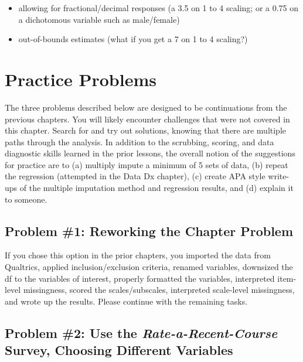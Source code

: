 \documentclass[
  11pt,
]{book}
\providecommand{\tightlist}{%
  \setlength{\itemsep}{0pt}\setlength{\parskip}{0pt}}
\begin{document}
\begin{itemize}
  \begin{itemize}
  \tightlist
  \item
    allowing for fractional/decimal responses (a 3.5 on 1 to 4 scaling; or a 0.75 on a dichotomous variable such as male/female)
  \item
    out-of-bounds estimates (what if you get a 7 on 1 to 4 scaling?)
  \end{itemize}
\end{itemize}

\hypertarget{practice-problems-3}{%
\section{Practice Problems}\label{practice-problems-3}}

The three problems described below are designed to be continuations from the previous chapters. You will likely encounter challenges that were not covered in this chapter. Search for and try out solutions, knowing that there are multiple paths through the analysis. In addition to the scrubbing, scoring, and data diagnostic skills learned in the prior lessons, the overall notion of the suggestions for practice are to (a) multiply impute a minimum of 5 sets of data, (b) repeat the regression (attempted in the Data Dx chapter), (c) create APA style write-ups of the multiple imputation method and regression results, and (d) explain it to someone.

\hypertarget{problem-1-reworking-the-chapter-problem-2}{%
\subsection{Problem \#1: Reworking the Chapter Problem}\label{problem-1-reworking-the-chapter-problem-2}}

If you chose this option in the prior chapters, you imported the data from Qualtrics, applied inclusion/exclusion criteria, renamed variables, downsized the df to the variables of interest, properly formatted the variables, interpreted item-level missingness, scored the scales/subscales, interpreted scale-level missingness, and wrote up the results. Please continue with the remaining tasks.

\hypertarget{problem-2-use-the-rate-a-recent-course-survey-choosing-different-variables-3}{%
\subsection{\texorpdfstring{Problem \#2: Use the \emph{Rate-a-Recent-Course} Survey, Choosing Different Variables}{Problem \#2: Use the Rate-a-Recent-Course Survey, Choosing Different Variables}}\label{problem-2-use-the-rate-a-recent-course-survey-choosing-different-variables-3}}
\end{document}

